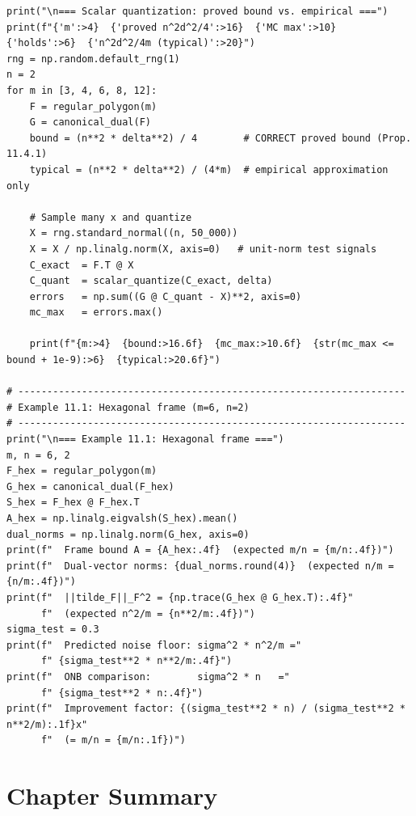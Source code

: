 \begin{lstlisting}[caption={Noise and quantization simulations for tight frames}]
print("\n=== Scalar quantization: proved bound vs. empirical ===")
print(f"{'m':>4}  {'proved n^2d^2/4':>16}  {'MC max':>10}  {'holds':>6}  {'n^2d^2/4m (typical)':>20}")
rng = np.random.default_rng(1)
n = 2
for m in [3, 4, 6, 8, 12]:
    F = regular_polygon(m)
    G = canonical_dual(F)
    bound = (n**2 * delta**2) / 4        # CORRECT proved bound (Prop. 11.4.1)
    typical = (n**2 * delta**2) / (4*m)  # empirical approximation only

    # Sample many x and quantize
    X = rng.standard_normal((n, 50_000))
    X = X / np.linalg.norm(X, axis=0)   # unit-norm test signals
    C_exact  = F.T @ X
    C_quant  = scalar_quantize(C_exact, delta)
    errors   = np.sum((G @ C_quant - X)**2, axis=0)
    mc_max   = errors.max()

    print(f"{m:>4}  {bound:>16.6f}  {mc_max:>10.6f}  {str(mc_max <= bound + 1e-9):>6}  {typical:>20.6f}")

# -------------------------------------------------------------------
# Example 11.1: Hexagonal frame (m=6, n=2)
# -------------------------------------------------------------------
print("\n=== Example 11.1: Hexagonal frame ===")
m, n = 6, 2
F_hex = regular_polygon(m)
G_hex = canonical_dual(F_hex)
S_hex = F_hex @ F_hex.T
A_hex = np.linalg.eigvalsh(S_hex).mean()
dual_norms = np.linalg.norm(G_hex, axis=0)
print(f"  Frame bound A = {A_hex:.4f}  (expected m/n = {m/n:.4f})")
print(f"  Dual-vector norms: {dual_norms.round(4)}  (expected n/m = {n/m:.4f})")
print(f"  ||tilde_F||_F^2 = {np.trace(G_hex @ G_hex.T):.4f}"
      f"  (expected n^2/m = {n**2/m:.4f})")
sigma_test = 0.3
print(f"  Predicted noise floor: sigma^2 * n^2/m ="
      f" {sigma_test**2 * n**2/m:.4f}")
print(f"  ONB comparison:        sigma^2 * n   ="
      f" {sigma_test**2 * n:.4f}")
print(f"  Improvement factor: {(sigma_test**2 * n) / (sigma_test**2 * n**2/m):.1f}x"
      f"  (= m/n = {m/n:.1f})")
\end{lstlisting}

\section{Chapter Summary}
\label{sec:summary-ch11}

